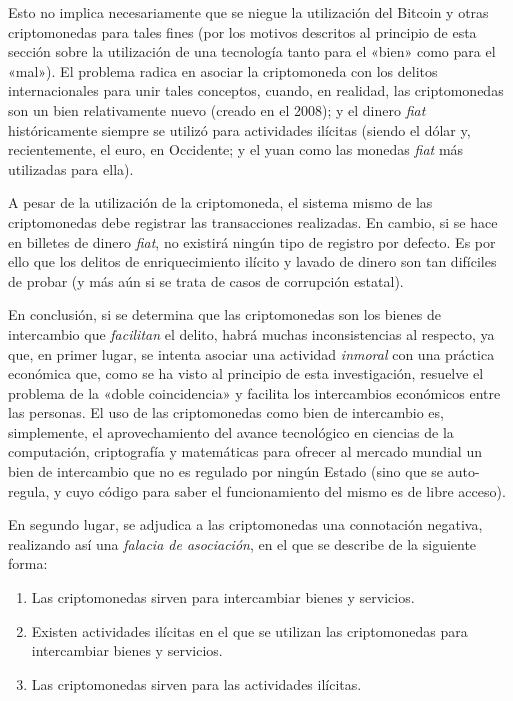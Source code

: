 \documentclass[12pt,a4paper,twoside]{book}
\begin{document}
Esto no implica necesariamente que se niegue la utilización del Bitcoin y otras criptomonedas para tales fines (por los motivos descritos al principio de esta sección sobre la utilización de una tecnología tanto para el «bien» como para el «mal»). El problema radica en asociar la criptomoneda con los delitos internacionales para unir tales conceptos, cuando, en realidad, las criptomonedas son un bien relativamente nuevo (creado en el 2008); y el dinero \textit{fiat} históricamente siempre se utilizó para actividades ilícitas (siendo el dólar y, recientemente, el euro, en Occidente; y el yuan como las monedas \textit{fiat} más utilizadas para ella).

A pesar de la utilización de la criptomoneda, el sistema mismo de las criptomonedas debe registrar las transacciones realizadas. En cambio, si se hace en billetes de dinero \textit{fiat}, no existirá ningún tipo de registro por defecto. Es por ello que los delitos de enriquecimiento ilícito y lavado de dinero son tan difíciles de probar (y más aún si se trata de casos de corrupción estatal).

En conclusión, si se determina que las criptomonedas son los bienes de intercambio que \textit{facilitan} el delito, habrá muchas inconsistencias al respecto, ya que, en primer lugar, se intenta asociar una actividad \textit{inmoral} con una práctica económica que, como se ha visto al principio de esta investigación, resuelve el problema de la «doble coincidencia» y facilita los intercambios económicos entre las personas. El uso de las criptomonedas como bien de intercambio es, simplemente, el aprovechamiento del avance tecnológico en ciencias de la computación, criptografía y matemáticas para ofrecer al mercado mundial un bien de intercambio que no es regulado por ningún Estado (sino que se auto-regula, y cuyo código para saber el funcionamiento del mismo es de libre acceso).

En segundo lugar, se adjudica a las criptomonedas una connotación negativa, realizando así una \textit{falacia de asociación}, en el que se describe de la siguiente forma:

\begin{enumerate}
\item Las criptomonedas sirven para intercambiar bienes y servicios.
\item Existen actividades ilícitas en el que se utilizan las criptomonedas para intercambiar bienes y servicios.
\item Las criptomonedas sirven para las actividades ilícitas.
\end{enumerate}
\end{document}
